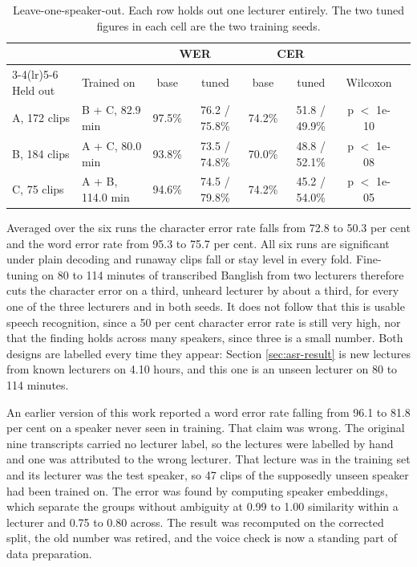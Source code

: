 \begin{table}[htbp]
\centering
\caption[Leave-one-speaker-out. Each row holds out one lecturer entirely]{Leave-one-speaker-out. Each row holds out one lecturer entirely. The two tuned
figures in each cell are the two training seeds.}
\label{tab:loso}
\small
\begin{tabular}{llcccccl}
\toprule
& & \multicolumn{2}{c}{WER} & \multicolumn{2}{c}{CER} & \\
\cmidrule(lr){3-4}\cmidrule(lr){5-6}
Held out & Trained on & base & tuned & base & tuned & Wilcoxon \\
\midrule
A, 172 clips & B + C, 82.9 min & 97.5\% & 76.2 / 75.8\% & 74.2\% & 51.8 / 49.9\% & p $<$ 1e-10 \\
B, 184 clips & A + C, 80.0 min & 93.8\% & 73.5 / 74.8\% & 70.0\% & 48.8 / 52.1\% & p $<$ 1e-08 \\
C, 75 clips  & A + B, 114.0 min & 94.6\% & 74.5 / 79.8\% & 74.2\% & 45.2 / 54.0\% & p $<$ 1e-05 \\
\bottomrule
\end{tabular}
\end{table}

Averaged over the six runs the character error rate falls from 72.8 to 50.3 per cent and
the word error rate from 95.3 to 75.7 per cent. All six runs are significant under plain
decoding and runaway clips fall or stay level in every fold. Fine-tuning on 80 to 114
minutes of transcribed Banglish from two lecturers therefore cuts the character error on
a third, unheard lecturer by about a third, for every one of the three lecturers and in
both seeds. It does not follow that this is usable speech recognition, since a 50 per
cent character error rate is still very high, nor that the finding holds across many
speakers, since three is a small number. Both designs are labelled every time they
appear: Section \ref{sec:asr-result} is new lectures from known lecturers on 4.10 hours,
and this one is an unseen lecturer on 80 to 114 minutes.

An earlier version of this work reported a word error rate falling from 96.1 to 81.8 per
cent on a speaker never seen in training. That claim was wrong. The original nine
transcripts carried no lecturer label, so the lectures were labelled by hand and one was
attributed to the wrong lecturer. That lecture was in the training set and its lecturer
was the test speaker, so 47 clips of the supposedly unseen speaker had been trained on.
The error was found by computing speaker embeddings, which separate the groups without
ambiguity at 0.99 to 1.00 similarity within a lecturer and 0.75 to 0.80 across. The result
was recomputed on the corrected split, the old number was retired, and the voice check is
now a standing part of data preparation.

